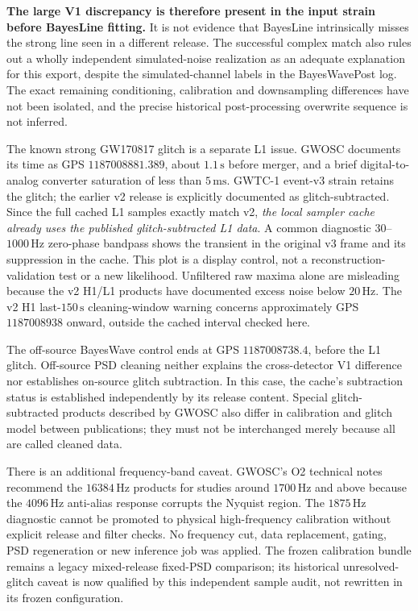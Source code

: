 \textbf{The large V1 discrepancy is therefore present in the input strain
before BayesLine fitting.} It is not evidence that BayesLine intrinsically
misses the strong line seen in a different release. The successful complex
match also rules out a wholly independent simulated-noise realization as
an adequate explanation for this export, despite the simulated-channel
labels in the BayesWavePost log. The exact remaining conditioning,
calibration and downsampling differences have not been isolated, and the
precise historical post-processing overwrite sequence is not inferred.

The known strong GW170817 glitch is a separate L1 issue. GWOSC documents
its time as GPS $1187008881.389$, about $1.1\,\mathrm{s}$ before merger,
and a brief digital-to-analog converter saturation of less than
$5\,\mathrm{ms}$. GWTC-1 event-v3 strain retains the glitch; the earlier
v2 release is explicitly documented as glitch-subtracted. Since the full
cached L1 samples exactly match v2, \emph{the local sampler cache already
uses the published glitch-subtracted L1 data}. A common diagnostic
$30$--$1000\,\mathrm{Hz}$ zero-phase bandpass shows the transient in the
original v3 frame and its suppression in the cache. This plot is a display
control, not a reconstruction-validation test or a new likelihood.
Unfiltered raw maxima alone are misleading because the v2 H1/L1 products
have documented excess noise below $20\,\mathrm{Hz}$. The v2 H1
last-$150\,\mathrm{s}$ cleaning-window warning concerns approximately
GPS $1187008938$ onward, outside the cached interval checked here.

The off-source BayesWave control ends at GPS $1187008738.4$, before the
L1 glitch. Off-source PSD cleaning neither explains the cross-detector
V1 difference nor establishes on-source glitch subtraction. In this case,
the cache's subtraction status is established independently by its release
content. Special glitch-subtracted products described by GWOSC also differ
in calibration and glitch model between publications; they must not be
interchanged merely because all are called cleaned data.

There is an additional frequency-band caveat. GWOSC's O2 technical notes
recommend the $16384\,\mathrm{Hz}$ products for studies around
$1700\,\mathrm{Hz}$ and above because the $4096\,\mathrm{Hz}$
anti-alias response corrupts the Nyquist region. The $1875\,\mathrm{Hz}$
diagnostic cannot be promoted to physical high-frequency calibration
without explicit release and filter checks. No frequency cut, data
replacement, gating, PSD regeneration or new inference job was applied.
The frozen calibration bundle remains a legacy mixed-release fixed-PSD
comparison; its historical unresolved-glitch caveat is now qualified by
this independent sample audit, not rewritten in its frozen configuration.

